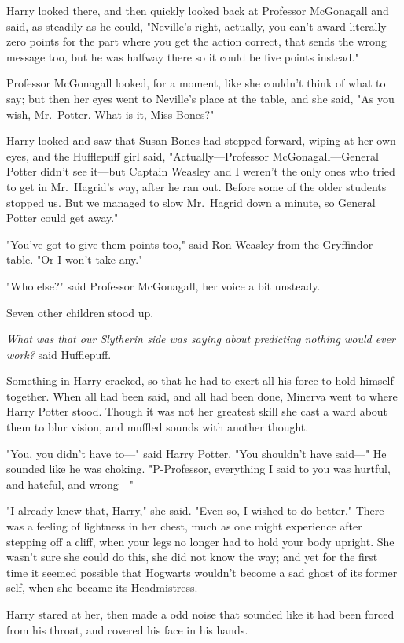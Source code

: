 Harry looked there, and then quickly looked back at Professor McGonagall and
said, as steadily as he could, "Neville's right, actually, you can't award
literally zero points for the part where you get the action correct, that sends
the wrong message too, but he was halfway there so it could be five points
instead."

Professor McGonagall looked, for a moment, like she couldn't think of what to
say; but then her eyes went to Neville's place at the table, and she said, "As
you wish, Mr.~Potter. What is it, Miss Bones?"

Harry looked and saw that Susan Bones had stepped forward, wiping at her own
eyes, and the Hufflepuff girl said, "Actually—Professor McGonagall—General
Potter didn't see it—but Captain Weasley and I weren't the only ones who
tried to get in Mr.~Hagrid's way, after he ran out. Before some of the older
students stopped us. But we managed to slow Mr.~Hagrid down a minute, so
General Potter could get away."

"You've got to give them points too," said Ron Weasley from the Gryffindor
table. "Or I won't take any."

"Who else?" said Professor McGonagall, her voice a bit unsteady.

Seven other children stood up.

\emph{What was that our Slytherin side was saying about predicting nothing
would ever work?} said Hufflepuff.

Something in Harry cracked, so that he had to exert all his force to hold
himself together.
\sbreak
When all had been said, and all had been done, Minerva went to where Harry
Potter stood. Though it was not her greatest skill she cast a ward about them
to blur vision, and muffled sounds with another thought.

"You, you didn't have to—" said Harry Potter. "You shouldn't have said—" He
sounded like he was choking. "P-Professor, everything I said to you was
hurtful, and hateful, and wrong—"

"I already knew that, Harry," she said. "Even so, I wished to do better." There
was a feeling of lightness in her chest, much as one might experience after
stepping off a cliff, when your legs no longer had to hold your body upright.
She wasn't sure she could do this, she did not know the way; and yet for the
first time it seemed possible that Hogwarts wouldn't become a sad ghost of its
former self, when she became its Headmistress.

Harry stared at her, then made a odd noise that sounded like it had been forced
from his throat, and covered his face in his hands.

